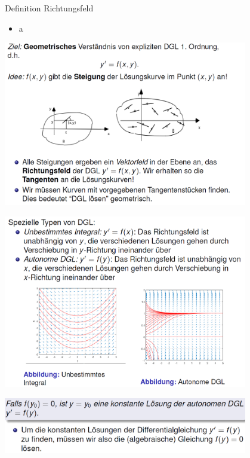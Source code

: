 \begin{definition}{Definition Richtungsfeld}\\
  \begin{itemize}
    \item a
  \end{itemize}
  \begin{center}
  \includegraphics[width=0.8\textwidth]{images/2024-06-02-22-06-02.png}
  \end{center}
  \begin{center}
  \includegraphics[width=0.8\textwidth]{images/2024-06-02-22-07-30.png}
  \end{center}
  \begin{center}
  \includegraphics[width=0.8\textwidth]{images/2024-06-02-22-08-12.png}
  \end{center}
\end{definition}
